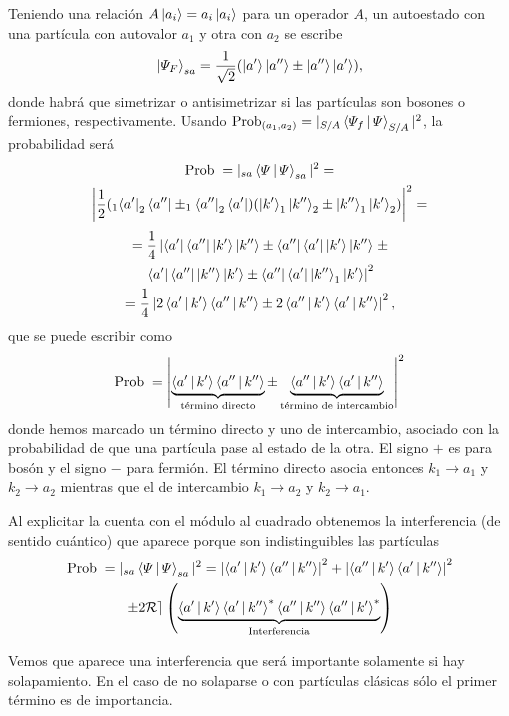 \documentclass[10pt,oneside]{CBFT_book}
\begin{document}
Teniendo una relación $A\Ket{a_i} = a_i \Ket{a_i}$ para un operador $A$, 
un autoestado con una partícula con autovalor $a_1$ y otra con $a_2$ se escribe
\[
	\Ket{ \Psi_F }_{sa} = \frac{1}{\sqrt{2}}( \Ket{a'}\Ket{a''} \pm \Ket{a''}\Ket{a'}),
\]
donde habrá que simetrizar o antisimetrizar si las partículas son bosones o fermiones,
respectivamente. Usando $ \text{Prob}_{(a_1,a_2)} = | _{S/A}\Braket{\Psi_f|\Psi}_{S/A} |^2 $,
la probabilidad será
\begin{multline*}
	\text{Prob}\; = |_{sa}\Braket{\Psi|\Psi}_{sa}|^2 =  \\
	\left|\frac{1}{2}(_1\Bra{a'}_2\Bra{a''} \pm _1\Bra{a''}_2\Bra{a'})(\Ket{k'}_1\Ket{k''}_2 \pm 
	\Ket{k''}_1\Ket{k'}_2)\right|^2 =
\end{multline*}
\begin{multline*}
 	= \frac{1}{4}\left| \Bra{a'}\Bra{a''}\Ket{k'}\Ket{k''} \pm \Bra{a''}\Bra{a'}\Ket{k'}\Ket{k''} 
	\right. \pm \\
	\left. \Bra{a'}\Bra{a''}\Ket{k''}\Ket{k'} \pm \Bra{a''}\Bra{a'}\Ket{k''}_1\Ket{k'} \right|^2 \\
	= \frac{1}{4}\left| 2\Braket{a'|k'}\Braket{a''|k''} \pm 2\Braket{a''|k'}\Braket{a'|k''}\right|^2, 
\end{multline*}
que se puede escribir como
\[
	\text{Prob}\; = \left| \underbrace{\Braket{a'|k'}\Braket{a''|k''}}_{\text{término directo}} \pm 
	\underbrace{\Braket{a''|k'}\Braket{a'|k''}}_\text{término de intercambio}\right|^2
\]
donde hemos marcado un término directo y uno de intercambio, asociado con la probabilidad de que una
partícula pase al estado de la otra. El signo $+$ es para bosón y el signo $-$ para fermión. El término 
directo asocia entonces $k_1 \to a_1$ y $k_2 \to a_2$ mientras que el de intercambio $k_1 \to a_2$ y 
$k_2 \to a_1$.

Al explicitar la cuenta con el módulo al cuadrado obtenemos la interferencia (de sentido cuántico) que
aparece porque son indistinguibles las partículas
\begin{multline*}
	\text{Prob}\; = |_{sa}\Braket{\Psi|\Psi}_{sa}|^2 = \left| \Braket{a'|k'}\Braket{a''|k''} \right|^2 + 
	\left|\Braket{a''|k'}\Braket{a'|k''}\right|^2  \\
	\pm 2\mathcal{Re}\left(\underbrace{ \Braket{a'|k'}\Braket{a'|k''}^*\Braket{a''|k''}\Braket{a''|k'}^* 
	}_\text{Interferencia}\right)
\end{multline*}

Vemos que aparece una interferencia que será importante solamente si hay solapamiento. En el caso de no 
solaparse o con partículas clásicas sólo el primer término es de importancia.
\end{document}
